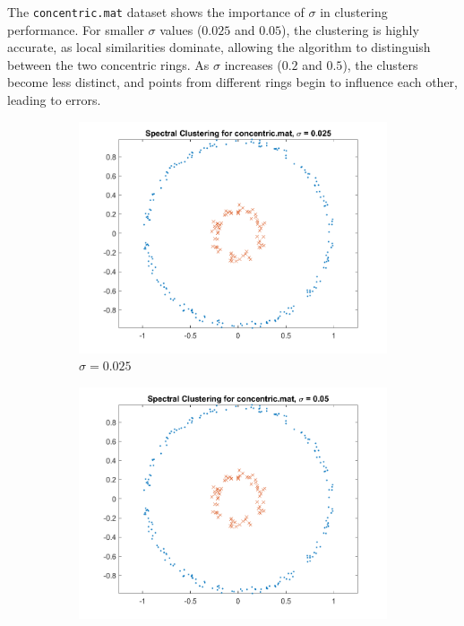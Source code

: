 \documentclass[11pt]{article}
\begin{document}
The \texttt{concentric.mat} dataset shows the importance of \(\sigma\) in clustering performance. For smaller \(\sigma\) values (\(0.025\) and \(0.05\)), the clustering is highly accurate, as local similarities dominate, allowing the algorithm to distinguish between the two concentric rings. As \(\sigma\) increases (\(0.2\) and \(0.5\)), the clusters become less distinct, and points from different rings begin to influence each other, leading to errors.

\begin{figure}[!ht]
    \centering
    \begin{subfigure}{0.45\textwidth}
        \includegraphics[width=\linewidth]{concentric_sigma_0.025.png}
        \caption{\(\sigma = 0.025\)}
    \end{subfigure}
    \begin{subfigure}{0.45\textwidth}
        \includegraphics[width=\linewidth]{concentric_sigma_0.050.png}

\end{subfigure}
\end{figure}
\end{document}
